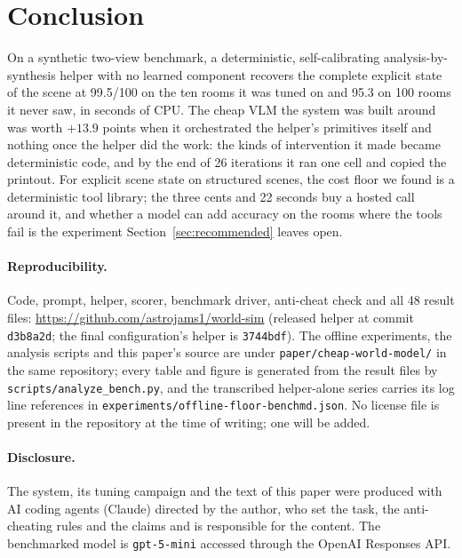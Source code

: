 \documentclass[10pt,a4paper]{article}
\begin{document}
\section{Conclusion}

On a synthetic two-view benchmark, a deterministic, self-calibrating analysis-by-synthesis helper with no learned component recovers the complete explicit state of the scene at 99.5/100 on the ten rooms it was tuned on and 95.3 on 100 rooms it never saw, in seconds of CPU. The cheap VLM the system was built around was worth $+13.9$ points when it orchestrated the helper's primitives itself and nothing once the helper did the work: the kinds of intervention it made became deterministic code, and by the end of 26 iterations it ran one cell and copied the printout. For explicit scene state on structured scenes, the cost floor we found is a deterministic tool library; the three cents and 22 seconds buy a hosted call around it, and whether a model can add accuracy on the rooms where the tools fail is the experiment Section~\ref{sec:recommended} leaves open.

\paragraph{Reproducibility.}
Code, prompt, helper, scorer, benchmark driver, anti-cheat check and all 48 result files: \url{https://github.com/astrojams1/world-sim} (released helper at commit \texttt{d3b8a2d}; the final configuration's helper is \texttt{3744bdf}). The offline experiments, the analysis scripts and this paper's source are under \texttt{paper/cheap-world-model/} in the same repository; every table and figure is generated from the result files by \texttt{scripts/analyze\_bench.py}, and the transcribed helper-alone series carries its log line references in \texttt{experiments/offline-floor-benchmd.json}. No license file is present in the repository at the time of writing; one will be added.

\paragraph{Disclosure.}
The system, its tuning campaign and the text of this paper were produced with AI coding agents (Claude) directed by the author, who set the task, the anti-cheating rules and the claims and is responsible for the content. The benchmarked model is \texttt{gpt-5-mini} accessed through the OpenAI Responses API.



\end{document}
